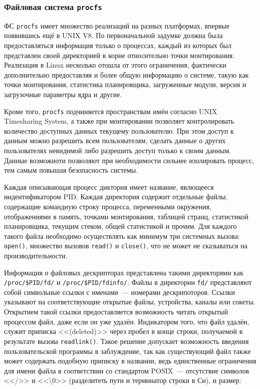 \subsubsection{Файловая система \texttt{procfs}}
\label{sub:domain:analogs:procfs}

ФС \texttt{procfs} имеет множество реализаций на разных платформах, впервые
появившись ещё в UNIX V8. По первоначальной задумке должна была предоставляться
информация только о процессах, каждый из которых был представлен своей
директорией в корне относительно точки монтирования. Реализация в Linux
несколько отошла от этого ограничения, фактически дополнительно предоставляя и
более общую информацию о системе, такую как точки монтирования, статистика
планировщика, загруженные модули, версия и загрузочные параметры ядра и
другие\cite{rlove}.

Кроме того, \texttt{procfs} подчиняется пространствам имён согласно UNIX
Timesharing System, а также при монтировании позволяет контролировать количество
доступных данных текущему пользователю. При этом доступ к данным можно разрешить
всем пользователям, сделать данные о других пользователях невидимой либо
разрешить доступ только к своим данным. Данные возможноти позволяют при
необходимости сильнее изолировать процесс, тем самым повышая безопасность
системы.

Каждая описывающая процесс диктория имеет название, явлющееся индентификатором
PID\cite{understanding}. Каждая директория содержит отдельные файлы, содержащие
командную строку 
процесса, переменными окружения, отображениями в память, точками монтирования,
таблицей странц, статистикой планировщика, текущим стеком, общей статистикой и
прочим. Для каждого такого файла необходимо осуществлять как минимум три
системных вызова: \texttt{open()}, множество вызовов \texttt{read()} и
\texttt{close()}, что не может не сказываться на производительности.

Информация о файловых дескрипторах представлена такими директорями как
\texttt{/proc/\$PID/fd/} и \texttt{/proc/\$PID/fdinfo/}. Файлы в директории
\texttt{fd/} представляют собой символьные ссылки с именами~---
номерами дескрипоторов. Ссылки указывают на соответствующие открытые файлы,
устройства, каналы или сокеты. Открытием такой ссылки предоставляется
возможность читать открытый процессом файл, даже если он уже удалён. Индикатором
того, что файл удалён, служит приписка <<(deleted)>> через пробел в конце
строки, получаемой в результате вызова \texttt{readlink()}. Такое решение
допускает возможность введения пользовательской программы в
заблуждение\cite{johnson}, так как
существующий файл также может содержать подобную приписку в названии, ведь
единственные ограничения для имени файла в соответствии со стандартом POSIX~---
отсутствие символов <</>> и <<\textbackslash0>> (разделитеть пути и терминатор
строки в Си), и размер:

